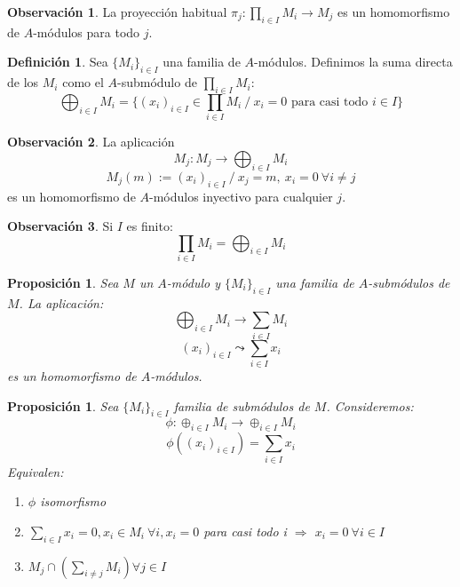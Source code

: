 \documentclass{article}
\theoremstyle{theorem-style}  %
\newtheorem{proposition}[theorem]{Proposición}
\theoremstyle{definition}
\newtheorem{definition}{Definición}[section]
\newtheorem*{observation}{Observación} %
\theoremstyle{example-style}
\begin{document}
\begin{observation}
	La proyección habitual $\pi_j:\prod_{i\in I}M_i \longrightarrow M_j$ es un homomorfismo de $A$-módulos para todo $j$.
\end{observation}

\begin{definition}
	Sea $\{M_i\}_{i\in I}$ una familia de $A$-módulos. Definimos la suma directa de los $M_i$ como el $A$-submódulo de $\prod_{i\in I}M_i$:
	\[\bigoplus_{i\in I}M_i=\{(x_i)_{i\in I} \in \prod_{i\in I}M_i \ / \ x_i=0 \text{ para casi todo } i \in I\}\]
\end{definition}

\begin{observation}
	La aplicación
	\[M_j:M_j\longrightarrow\bigoplus_{i\in I}M_i\]
	\[M_j(m):= (x_i)_{i\in I} \ / \ x_j=m,\  x_i=0 \ \forall i\neq j \]
	es un homomorfismo de $A$-módulos inyectivo para cualquier $j$.
\end{observation}

\begin{observation}
	Si $I$ es finito:
	\[\prod_{i\in I}M_i = \bigoplus_{i\in I}M_i \]
\end{observation}

\begin{proposition}
	Sea $M$ un $A$-módulo y $\{M_i\}_{i\in I}$ una familia de $A$-submódulos de $M$. La aplicación:
	\[ \bigoplus_{i\in I}M_i \longrightarrow \sum_{i\in I}M_i \]
	\[ (x_i)_{i\in I} \leadsto \sum_{i\in I}x_i \]
	es un homomorfismo de $A$-módulos.
\end{proposition}

\begin{proposition}
	Sea $ \{M_i\}_{i\in I} $ familia de submódulos de $ M $. Consideremos:
	\[\phi : \oplus_{i\in I} M_i\longrightarrow \oplus_{i\in I }M_i \]
	\[\phi ((x_i)_{i\in I})=\sum_{i\in I} x_i \]
	Equivalen:
	\begin{enumerate}[\hspace{1cm}i)]
		\item $\phi$ isomorfismo
		\item $\sum_{i\in I}x_i=0,x_i \in M_i \ \forall i, x_i=0$ para casi todo i $\Rightarrow$ $ x_i=0 \ \forall i \in I $
		\item $M_j \cap (\sum_{i\neq j}M_i)\forall j \in I$
	\end{enumerate}
\end{proposition}
\end{document}
